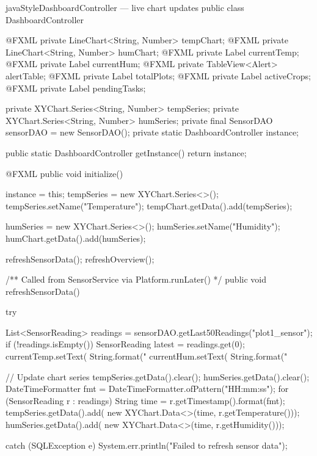 \documentclass[12pt, a4paper]{report}
\begin{document}
\begin{codeblock}{javaStyle}{DashboardController --- live chart updates}
public class DashboardController {
    @FXML private LineChart<String, Number> tempChart;
    @FXML private LineChart<String, Number> humChart;
    @FXML private Label currentTemp;
    @FXML private Label currentHum;
    @FXML private TableView<Alert> alertTable;
    @FXML private Label totalPlots;
    @FXML private Label activeCrops;
    @FXML private Label pendingTasks;

    private XYChart.Series<String, Number> tempSeries;
    private XYChart.Series<String, Number> humSeries;
    private final SensorDAO sensorDAO = new SensorDAO();
    private static DashboardController instance;

    public static DashboardController getInstance() {
        return instance;
    }

    @FXML
    public void initialize() {
        instance = this;
        tempSeries = new XYChart.Series<>();
        tempSeries.setName("Temperature");
        tempChart.getData().add(tempSeries);

        humSeries = new XYChart.Series<>();
        humSeries.setName("Humidity");
        humChart.getData().add(humSeries);

        refreshSensorData();
        refreshOverview();
    }

    /** Called from SensorService via Platform.runLater() */
    public void refreshSensorData() {
        try {
            List<SensorReading> readings =
                sensorDAO.getLast50Readings("plot1_sensor");
            if (!readings.isEmpty()) {
                SensorReading latest = readings.get(0);
                currentTemp.setText(
                    String.format("%
                currentHum.setText(
                    String.format("%
            }

            // Update chart series
            tempSeries.getData().clear();
            humSeries.getData().clear();
            DateTimeFormatter fmt =
                DateTimeFormatter.ofPattern("HH:mm:ss");
            for (SensorReading r : readings) {
                String time = r.getTimestamp().format(fmt);
                tempSeries.getData().add(
                    new XYChart.Data<>(time, r.getTemperature()));
                humSeries.getData().add(
                    new XYChart.Data<>(time, r.getHumidity()));
            }
        } catch (SQLException e) {
            System.err.println("Failed to refresh sensor data");
        }
    }
}
\end{codeblock}
\end{document}
